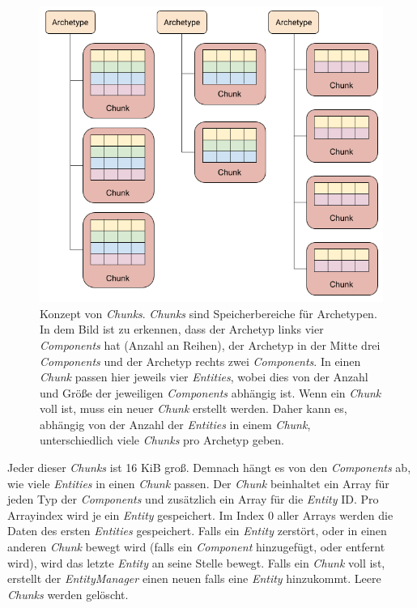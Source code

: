 \documentclass[12pt, titlepage]{article}
\DeclareRobustCommand{\#}{\adjustbox{valign=B,totalheight=.57\baselineskip}{\oldhash}}%
\begin{document}
\begin{figure}[H]
\begin{center}
\includegraphics[scale=0.45]{Bilder/ArchetypeChunkDiagram.png}
\caption{Konzept von \textit{Chunks}. \textit{Chunks} sind Speicherbereiche für Archetypen. In dem Bild ist zu erkennen, dass der Archetyp links vier \textit{Components} hat (Anzahl an Reihen), der Archetyp in der Mitte drei \textit{Components} und der Archetyp rechts zwei \textit{Components}. In einen \textit{Chunk} passen hier jeweils vier \textit{Entities}, wobei dies von der Anzahl und Größe der jeweiligen \textit{Components} abhängig ist. Wenn ein \textit{Chunk} voll ist, muss ein neuer \textit{Chunk} erstellt werden. Daher kann es, abhängig von der Anzahl der \textit{Entities} in einem \textit{Chunk}, unterschiedlich viele \textit{Chunks} pro Archetyp geben.}
\label{fig:archetyp_chunks}
\end{center}
\end{figure}
Jeder dieser \textit{Chunks} ist 16 KiB groß. Demnach hängt es von den \textit{Components} ab, wie viele \textit{Entities} in einen \textit{Chunk} passen. Der \textit{Chunk} beinhaltet ein Array für jeden Typ der \textit{Components} und zusätzlich ein Array für die \textit{Entity} ID. Pro Arrayindex wird je ein \textit{Entity} gespeichert. Im Index 0 aller Arrays werden die Daten des ersten \textit{Entities} gespeichert. Falls ein \textit{Entity} zerstört, oder in einen anderen \textit{Chunk} bewegt wird (falls ein \textit{Component} hinzugefügt, oder entfernt wird), wird das letzte \textit{Entity} an seine Stelle bewegt. Falls ein \textit{Chunk} voll ist, erstellt der \textit{EntityManager} einen neuen falls eine \textit{Entity} hinzukommt. Leere \textit{Chunks} werden gelöscht.
\end{document}
